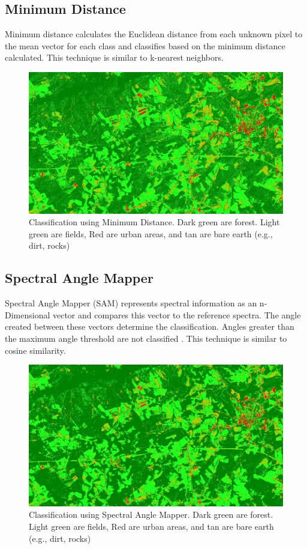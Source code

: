 \documentclass{sigkddExp}
\begin{document}
\subsection{Minimum Distance}

Minimum distance calculates the Euclidean distance from each unknown pixel to the mean vector for each class \cite{envi_md} and classifies based on the minimum distance calculated.
This technique is similar to k-nearest neighbors.

\begin{figure}[ht!]
  \includegraphics[width=\linewidth]{floyd_md.jpg}
  \caption{Classification using Minimum Distance.
  Dark green are forest. Light green are fields, Red are urban areas, and tan are bare earth (e.g., dirt, rocks)}
  \label{fig:md}
 \end{figure}

\subsection{Spectral Angle Mapper}

Spectral Angle Mapper (SAM) represents spectral information as an n-Dimensional vector and compares this vector to the reference spectra.
The angle created between these vectors determine the classification.
Angles greater than the maximum angle threshold are not classified \cite{envi_sam}.
This technique is similar to cosine similarity.

\begin{figure}[ht!]
  \includegraphics[width=\linewidth]{floyd_sam.jpg}
  \caption{Classification using Spectral Angle Mapper.
  Dark green are forest. Light green are fields, Red are urban areas, and tan are bare earth (e.g., dirt, rocks)}
  \label{fig:sam}
\end{figure}
\end{document}
